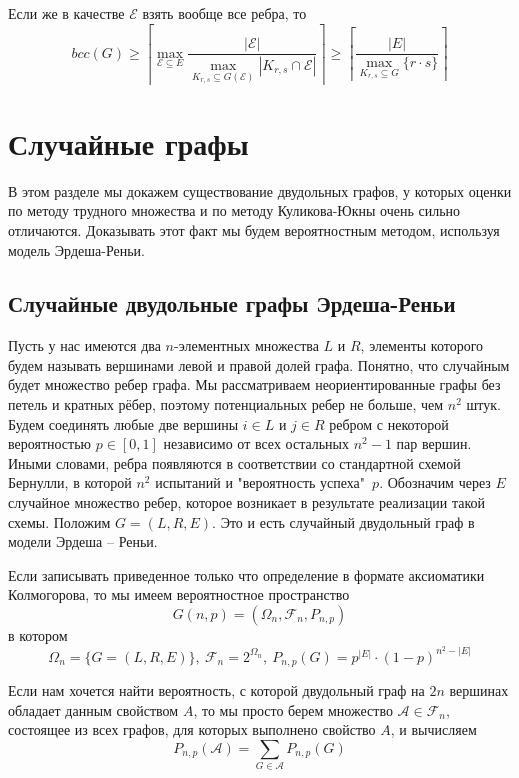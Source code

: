 \documentclass[a4paper]{article}
\begin{document}
Если же в качестве $\mathcal{E}$ взять вообще все ребра, то $$bcc(G) \geq \left\lceil\max\limits_{\mathcal{E}\subseteq E}\frac{|\mathcal{E}|}
{\max\limits_{K_{r,s}\subseteq G(\mathcal{E})}|K_{r,s}\cap\mathcal{E}|}\right\rceil \geq \left\lceil\frac{|E|}
{\max\limits_{K_{r,s}\subseteq G}\{r\cdot s\}}\right\rceil$$

\setcounter{mclaim}{0}
\setcounter{mlemma}{0}
\setcounter{mtheorem}{0}
\addtocounter{section}{1}
\section*{Случайные графы}
В этом разделе мы докажем существование двудольных графов, у которых оценки по методу трудного множества и 
по методу Куликова-Юкны очень сильно отличаются. Доказывать этот факт мы будем вероятностным методом, 
используя модель Эрдеша-Реньи.

\setcounter{subsection}{0}
\subsection{Случайные двудольные графы Эрдеша-Реньи}

Пусть у нас имеются два $n$-элементных множества $L$ и $R$, элементы которого будем называть вершинами 
левой и правой долей графа. Понятно, что случайным будет множество ребер графа. Мы рассматриваем 
неориентированные графы без петель и кратных рёбер, поэтому потенциальных ребер не больше, чем $n^2$ штук. 
Будем соединять любые две вершины $i \in L$ и $j \in R$ ребром с некоторой вероятностью $p\in [0, 1]$ 
независимо от всех остальных $n^2 - 1$ пар вершин. Иными словами, ребра появляются в соответствии со 
стандартной схемой Бернулли, в которой $n^2$ испытаний и "вероятность успеха"\ $p$. Обозначим через $E$
случайное множество ребер, которое возникает в результате реализации такой схемы. Положим $G = (L, R, E)$. 
Это и есть случайный двудольный граф в модели Эрдеша – Реньи. 

Если записывать приведенное только что определение в формате аксиоматики Колмогорова, то мы имеем 
вероятностное пространство $$G(n, p) = (\Omega_n, \mathcal{F}_n, P_{n,p})$$ в котором 
$$\Omega_n = \{G = (L, R, E)\},\ \mathcal{F}_n = 2^{\Omega_n},\ P_{n,p}(G) = p^{|E|}\cdot(1-p)^{n^2 -|E|}$$

Если нам хочется найти вероятность, с которой двудольный граф на $2n$ вершинах обладает данным свойством $A$, 
то мы просто берем множество $\mathcal{A} \in \mathcal{F}_n$, состоящее из всех графов, для которых 
выполнено свойство $A$, и вычисляем $$P_{n,p}(\mathcal{A}) = \sum\limits_{G\in\mathcal{A}}P_{n,p}(G)$$
\end{document}
